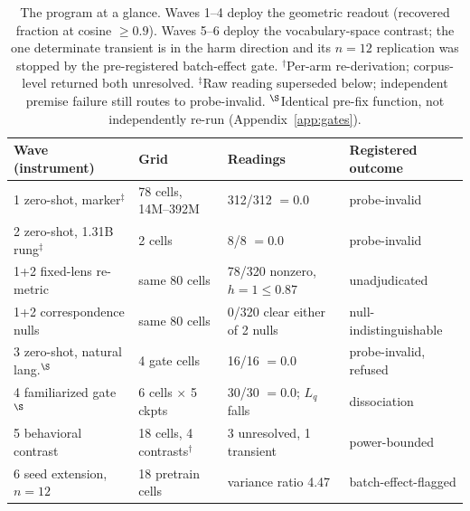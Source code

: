 \documentclass{article} %
\begin{document}
\begin{table}[t]
\centering
\footnotesize
\setlength{\tabcolsep}{3pt}
\begin{tabular}{@{}llll@{}}
\toprule
Wave (instrument) & Grid & Readings & Registered outcome \\
\midrule
1 zero-shot, marker$^{\ddagger}$ & 78 cells, 14M--392M & 312/312 $= 0.0$ & probe-invalid \\ %
2 zero-shot, 1.31B rung$^{\ddagger}$ & 2 cells & 8/8 $= 0.0$ & probe-invalid \\ %
1+2 fixed-lens re-metric & same 80 cells & 78/320 nonzero, $h{=}1{\leq}0.87$ & unadjudicated \\ %
1+2 correspondence nulls & same 80 cells & 0/320 clear either of 2 nulls & null-indistinguishable \\ %
3 zero-shot, natural lang.$^{\S}$ & 4 gate cells & 16/16 $= 0.0$ & probe-invalid, refused \\ %
4 familiarized gate$^{\S}$ & 6 cells $\times$ 5 ckpts & 30/30 $= 0.0$; $L_q$ falls & dissociation \\ %
5 behavioral contrast & 18 cells, 4 contrasts$^{\dagger}$ & 3 unresolved, 1 transient & power-bounded \\ %
6 seed extension, $n{=}12$ & 18 pretrain cells & variance ratio 4.47 & batch-effect-flagged \\ %
\bottomrule
\end{tabular}
\caption{The program at a glance. Waves 1--4 deploy the geometric readout
(recovered fraction at cosine $\geq 0.9$). Waves 5--6 deploy the
vocabulary-space contrast; the one determinate transient is in the harm
direction and its $n{=}12$ replication was stopped by the pre-registered
batch-effect gate.
$^{\dagger}$Per-arm re-derivation; corpus-level returned both unresolved.
$^{\ddagger}$Raw reading superseded below; independent premise failure
still routes to probe-invalid. $^{\S}$Identical pre-fix function, not
independently re-run (Appendix~\ref{app:gates}).}
\label{tab:program}
\end{table}
\end{document}
